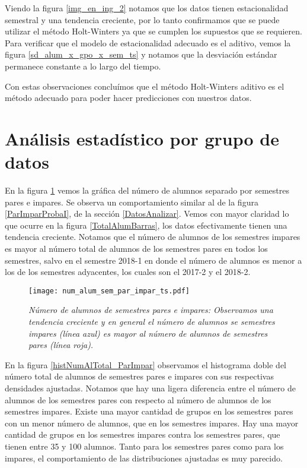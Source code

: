 Viendo la figura \ref{img_en_ing_2} notamos que los datos tienen estacionalidad semestral y una tendencia creciente, por lo tanto confirmamos que se puede utilizar el método Holt-Winters ya que se cumplen los supuestos que se requieren. Para verificar que el modelo de estacionalidad adecuado es el aditivo, vemos la figura \ref{sd_alum_x_gpo_x_sem_ts} y notamos que la desviación estándar permanece constante a lo largo del tiempo.

Con estas observaciones concluímos que el método Holt-Winters aditivo es el método adecuado para poder hacer predicciones con nuestros datos.

\section{Análisis estadístico por grupo de datos} \label{AE_x_GpoDeDatos}

En la figura \ref{NumAlTotal_ParImpar_ts} vemos la gráfica del número de alumnos separado por semestres pares e impares. Se observa un comportamiento similar al de la figura \ref{ParImparProbaI}, de la sección \ref{DatosAnalizar}. Vemos con mayor claridad lo que ocurre en la figura \ref{TotalAlumBarras}, los datos efectivamente tienen una tendencia creciente. Notamos que el número de alumnos de los semestres impares es mayor al número total de alumnos de los semestres pares en todos los semestres, salvo en el semestre 2018-1 en donde el número de alumnos es menor a los de los semestres adyacentes, los cuales son el 2017-2 y el 2018-2.

\begin{figure}[H]
\centering
\texttt{[image: num\_alum\_sem\_par\_impar\_ts.pdf]} %
\caption[\textit{Número de alumnos de semestres pares e impares}]{\textit{Número de alumnos de semestres pares e impares: Observamos una tendencia creciente y en general el número de alumnos se semestres impares (línea azul) es mayor al número de alumnos de semestres pares (línea roja).}}\label{NumAlTotal_ParImpar_ts}
\end{figure}


En la figura \ref{histNumAlTotal_ParImpar} observamos el histograma doble del número total de alumnos de semestres pares e impares con sus respectivas densidades ajustadas. Notamos que hay una ligera diferencia entre el número de alumnos de los semestres pares con respecto al número de alumnos de los semestres impares. Existe una mayor cantidad de grupos en los semestres pares con un menor número de alumnos, que en los semestres impares. Hay una mayor cantidad de grupos en los semestres impares contra los semestres pares, que tienen entre 35 y 100 alumnos. Tanto para los semestres pares como para los impares, el comportamiento de las distribuciones ajustadas es muy parecido.

